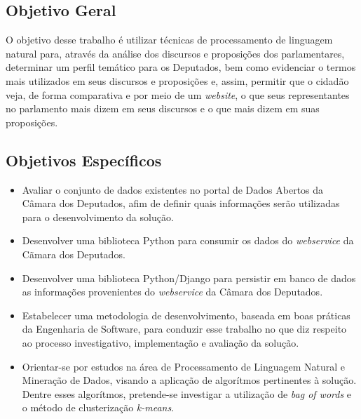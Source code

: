 \subsection{Objetivo Geral}
\label{sub:objetivo_geral}

O objetivo desse trabalho é utilizar técnicas de processamento de linguagem natural para, através da análise dos discursos e proposições dos parlamentares, determinar um perfil temático para os Deputados, bem como evidenciar o termos mais utilizados em seus discursos e proposições e, assim, permitir que o cidadão veja, de forma comparativa e por meio de um \textit{website}, o que seus representantes no parlamento mais dizem em seus discursos e o que mais dizem em suas proposições.

\subsection{Objetivos Específicos}
\label{sub:objetivos_específicos}

\begin{itemize}
    \item Avaliar o conjunto de dados existentes no portal de Dados Abertos da Câmara dos Deputados, afim de definir quais informações serão utilizadas para o desenvolvimento da solução.
    \item Desenvolver uma biblioteca Python para consumir os dados do \textit{webservice} da Cãmara dos Deputados.
    \item Desenvolver uma biblioteca Python/Django para persistir em banco de dados as informações provenientes do \textit{webservice} da Câmara dos Deputados.
    \item Estabelecer uma metodologia de desenvolvimento, baseada em boas práticas da Engenharia de Software, para conduzir esse trabalho no que diz respeito ao processo investigativo, implementação e avaliação da solução.
    \item Orientar-se por estudos na área de Processamento de Linguagem Natural e Mineração de Dados, visando a aplicação de algorítmos pertinentes à solução. Dentre esses algorítmos, pretende-se investigar a utilização de \textit{bag of words} e o método de clusterização \textit{k-means}.
\end{itemize}